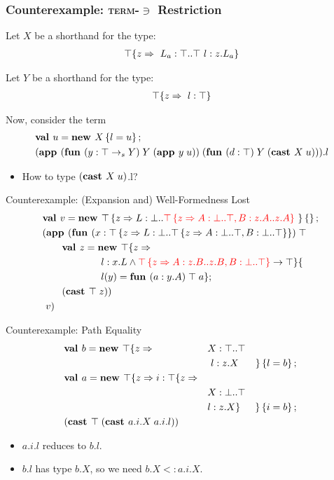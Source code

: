 \documentclass{beamer}
\begin{document}
\begin{frame}[fragile]
\frametitle{Counterexample: \texorpdfstring{\textsc{term-$\ni$}}{Term-Mem} Restriction}
Let $X$ be a shorthand for the type:
\begin{align*}
\top \{z \Rightarrow 
\ L_a : \top..\top
\ l : z.L_a
 \}
\end{align*}

Let $Y$ be a shorthand for the type:
\begin{align*}
\top \{z \Rightarrow 
\ l : \top
 \}
\end{align*}

Now, consider the term
\begin{align*}
&\mlnew u {X \ldefs{ l = u }}{
\app {(\fun y {\arrow \Top Y} {Y} {\app y u})} {(\fun d \Top Y {\cast X u})}.l
}
\end{align*}

\begin{itemize}
\item How to type ${(\textbf{cast }X\;u)}$.l?
\end{itemize}
\end{frame}

\begin{frame}[fragile]{Counterexample: (Expansion and) Well-Formedness Lost}
\begin{align*}
&\textbf{val }v = \textbf{new }\top \left\{z \Rightarrow L : \bot..{\color{red}{\top\left\{z \Rightarrow A : \bot..\top, B : z.A..z.A \right\}}}\  \right\} \left\{\right\} ;\;\\&
(\textbf{app }(\textbf{fun } (x:\top \left\{z \Rightarrow L : \bot..\top \left\{z \Rightarrow A : \bot..\top, B : \bot..\top \right\} \right\})\;\top\;\\&\quad\quad
\textbf{val }z = \textbf{new }\top \{z \Rightarrow \\&\quad\quad\quad\quad\quad\quad
l : x.L \wedge {\color{red}{\top\left\{z \Rightarrow A : z.B..z.B, B : \bot..\top\right\}}} \rightarrow \top \}\{\\&\quad\quad\quad\quad\quad\quad
l(y) = \textbf{fun } (a:y.A)\;\top\;a\} ;\;\\&
\quad\quad (\textbf{cast }\top\;z)
)\;\\&\ v)
\end{align*}
\end{frame}

\begin{frame}[fragile]{Counterexample: Path Equality}
\begin{align*}
&\textbf{val }b = \textbf{new }\top \{z \Rightarrow &&X : \top..\top&\\
&&&\ l : z.X& \}\left\{l = b\right\} ;\;\\&
\textbf{val }a = \textbf{new }\top \{z \Rightarrow i : \top \{z \Rightarrow &&&\\
&&&X : \bot..\top\\
&&&l : z.X \}& \}\left\{i = b\right\} ;\;\\&
{(\textbf{cast }\top\;(\textbf{cast }a.i.X\;a.i.l))}
\end{align*}

\begin{itemize}
\item $a.i.l$ reduces to $b.l$.
\item $b.l$ has type $b.X$, so we need $b.X <: a.i.X$.
\end{itemize}
\end{frame}
\end{document}
